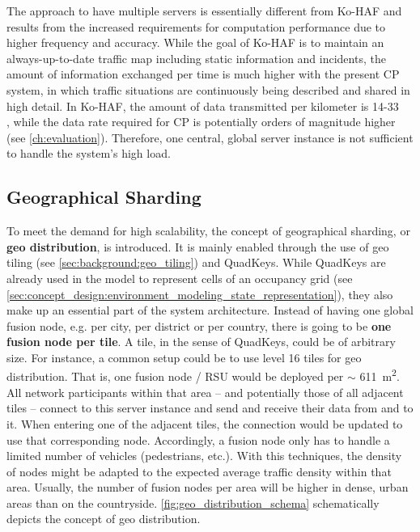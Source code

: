 The approach to have multiple servers is essentially different from Ko-HAF and results from the increased requirements for computation performance due to higher frequency and accuracy. While the goal of Ko-HAF is to maintain an always-up-to-date traffic map including static information and incidents, the amount of information exchanged per time is much higher with the present CP system, in which traffic situations are continuously being described and shared in high detail. In Ko-HAF, the amount of data transmitted per kilometer is 14-33 \si{\kilo\byte} \cite{Hohm2019}, while the data rate required for CP is potentially orders of magnitude higher (see \autoref{ch:evaluation}). Therefore, one central, global server instance is not sufficient to handle the system's high load.

\subsection{Geographical Sharding}
\label{subsec:conept_design:geographical_sharding}
To meet the demand for high scalability, the concept of geographical sharding, or \textbf{geo distribution}, is introduced. It is mainly enabled through the use of geo tiling (see \autoref{sec:background:geo_tiling}) and QuadKeys. While QuadKeys are already used in the model to represent cells of an occupancy grid (see \autoref{sec:concept_design:environment_modeling_state_representation}), they also make up an essential part of the system architecture. Instead of having one global fusion node, e.g. per city, per district or per country, there is going to be \textbf{one fusion node per tile}. A tile, in the sense of QuadKeys, could be of arbitrary size. For instance, a common setup could be to use level 16 tiles for geo distribution. That is, one fusion node / RSU would be deployed per $\sim$ \SI{611}{\square\meter}. All network participants within that area – and potentially those of all adjacent tiles – connect to this server instance and send and receive their data from and to it. When entering one of the adjacent tiles, the connection would be updated to use that corresponding node. Accordingly, a fusion node only has to handle a limited number of vehicles (pedestrians, etc.). With this techniques, the density of nodes might be adapted to the expected average traffic density within that area. Usually, the number of fusion nodes per area will be higher in dense, urban areas than on the countryside. \autoref{fig:geo_distribution_schema} schematically depicts the concept of geo distribution.

